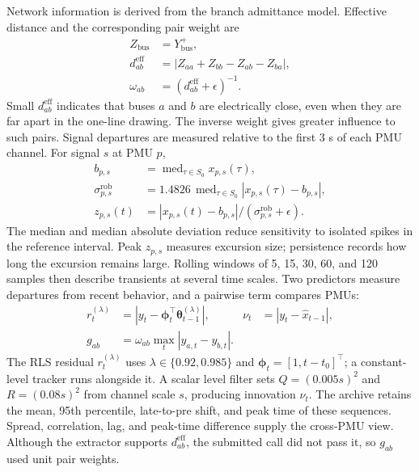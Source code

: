 \documentclass[conference]{IEEEtran}
\begin{document}
Network information is derived from the branch admittance model. Effective distance and the corresponding pair weight are
\begin{equation}
\begin{aligned}
Z_{\mathrm{bus}}&=Y_{\mathrm{bus}}^{+},\\
d_{ab}^{\mathrm{eff}}&=|Z_{aa}+Z_{bb}-Z_{ab}-Z_{ba}|,\\
\omega_{ab}&=(d_{ab}^{\mathrm{eff}}+\epsilon)^{-1}.
\end{aligned}
\label{eq:distance}
\end{equation}
Small $d_{ab}^{\mathrm{eff}}$ indicates that buses $a$ and $b$ are electrically close, even when they are far apart in the one-line drawing. The inverse weight gives greater influence to such pairs. Signal departures are measured relative to the first 3 s of each PMU channel. For signal $s$ at PMU $p$,
\begin{equation}
\begin{aligned}
b_{p,s}&=\mathop{\mathrm{med}}_{\tau\in S_0}x_{p,s}(\tau),\\
\sigma^{\mathrm{rob}}_{p,s}&=1.4826\,\mathop{\mathrm{med}}_{\tau\in S_0}|x_{p,s}(\tau)-b_{p,s}|,\\
z_{p,s}(t)&=|x_{p,s}(t)-b_{p,s}|/(\sigma^{\mathrm{rob}}_{p,s}+\epsilon).
\end{aligned}
\label{eq:baseline}
\end{equation}
The median and median absolute deviation reduce sensitivity to isolated spikes in the reference interval. Peak $z_{p,s}$ measures excursion size; persistence records how long the excursion remains large. Rolling windows of 5, 15, 30, 60, and 120 samples then describe transients at several time scales. Two predictors measure departures from recent behavior, and a pairwise term compares PMUs:
\begin{equation}
\begin{aligned}
r_t^{(\lambda)}&=\left|y_t-\boldsymbol{\phi}_t^\top
\boldsymbol{\theta}_{t-1}^{(\lambda)}\right|, &
\nu_t&=\left|y_t-\hat{x}_{t-1}\right|,\\
g_{ab}&=\omega_{ab}\max_t|y_{a,t}-y_{b,t}|.
\end{aligned}
\label{eq:dynamic}
\end{equation}
The RLS residual $r_t^{(\lambda)}$ uses $\lambda\in\{0.92,0.985\}$ and $\boldsymbol{\phi}_t=[1,t-t_0]^\top$; a constant-level tracker runs alongside it. A scalar level filter sets $Q=(0.005s)^2$ and $R=(0.08s)^2$ from channel scale $s$, producing innovation $\nu_t$. The archive retains the mean, 95th percentile, late-to-pre shift, and peak time of these sequences. Spread, correlation, lag, and peak-time difference supply the cross-PMU view. Although the extractor supports $d_{ab}^{\mathrm{eff}}$, the submitted call did not pass it, so $g_{ab}$ used unit pair weights.
\end{document}
